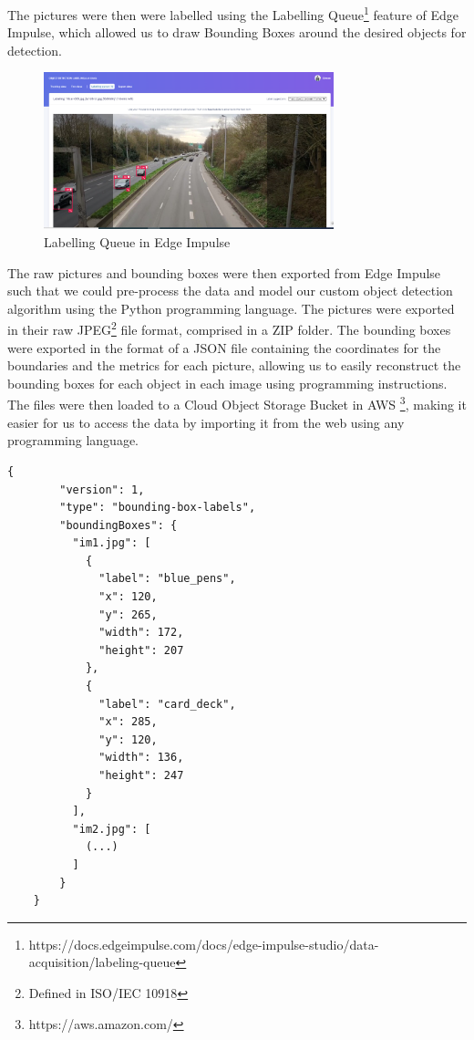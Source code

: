 \documentclass[openright]{normas-utf-tex} %
\begin{document}
The pictures were then were labelled using the Labelling Queue\footnote{https://docs.edgeimpulse.com/docs/edge-impulse-studio/data-acquisition/labeling-queue}
feature of Edge Impulse, which allowed us to draw Bounding Boxes around the desired objects for detection.

\begin{figure}[H]
	\centering
	\includegraphics[width=0.75\textwidth]{./images/edge-impulse-labelling-queue.png}
	\caption[Labelling Queue in Edge Impulse]{Labelling Queue in Edge Impulse}
    \label{fig:diff}
\end{figure}

The raw pictures and bounding boxes were then exported from Edge Impulse such
that we could pre-process the data and model our custom object detection
algorithm using the Python programming language. The pictures were exported in
their raw JPEG\footnote{Defined in ISO/IEC 10918}  file format, comprised in a
ZIP folder. The bounding boxes were exported in the format of a JSON file
containing the coordinates for the boundaries and the metrics for each picture,
allowing us to easily reconstruct the bounding boxes for each object in each
image using programming instructions. The files were then loaded to a Cloud
Object Storage Bucket in AWS \footnote{https://aws.amazon.com/}, making it
easier for us to access the data by importing it from the web using any
programming language.

\begin{lstlisting}[caption={Bounding boxes coordinates file exported from Edge Impulse},label={lst:boundingBoxCoordinates}]
	{
		"version": 1,
		"type": "bounding-box-labels",
		"boundingBoxes": {
		  "im1.jpg": [
			{
			  "label": "blue_pens",
			  "x": 120,
			  "y": 265,
			  "width": 172,
			  "height": 207
			},
			{
			  "label": "card_deck",
			  "x": 285,
			  "y": 120,
			  "width": 136,
			  "height": 247
			}
		  ],
		  "im2.jpg": [
			(...)
		  ]
		}
	}
\end{lstlisting}
\end{document}
